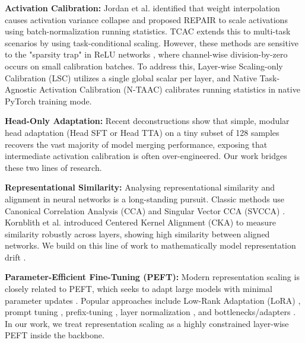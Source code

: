 \documentclass{article}
\theoremstyle{plain}
\theoremstyle{definition}
\theoremstyle{remark}
\begin{document}
\textbf{Activation Calibration:} Jordan et al. \cite{jordan2023repair} identified that weight interpolation causes activation variance collapse and proposed REPAIR to scale activations using batch-normalization \cite{ioffe2015batch} running statistics. TCAC \cite{anonymous2026pragmatic} extends this to multi-task scenarios by using task-conditional scaling. However, these methods are sensitive to the "sparsity trap" in ReLU networks \cite{anonymous2026less}, where channel-wise division-by-zero occurs on small calibration batches. To address this, Layer-wise Scaling-only Calibration (LSC) \cite{anonymous2026less} utilizes a single global scalar per layer, and Native Task-Agnostic Activation Calibration (N-TAAC) \cite{anonymous2026deconstructing} calibrates running statistics in native PyTorch \cite{paszke2019pytorch} training mode.

\textbf{Head-Only Adaptation:} Recent deconstructions \cite{anonymous2026deconstructing_head} show that simple, modular head adaptation (Head SFT or Head TTA) on a tiny subset of 128 samples recovers the vast majority of model merging performance, exposing that intermediate activation calibration is often over-engineered. Our work bridges these two lines of research.

\textbf{Representational Similarity:} Analysing representational similarity and alignment in neural networks is a long-standing pursuit. Classic methods use Canonical Correlation Analysis (CCA) and Singular Vector CCA (SVCCA) \cite{raghu2017svcca, morcos2018insights}. Kornblith et al. \cite{kornblith2019similarity} introduced Centered Kernel Alignment (CKA) to measure similarity robustly across layers, showing high similarity between aligned networks. We build on this line of work to mathematically model representation drift \cite{garg2022path, lenc2015understanding}.

\textbf{Parameter-Efficient Fine-Tuning (PEFT):} Modern representation scaling is closely related to PEFT, which seeks to adapt large models with minimal parameter updates \cite{hu2021lora, he2021towards}. Popular approaches include Low-Rank Adaptation (LoRA) \cite{hu2021lora}, prompt tuning \cite{lester2021power}, prefix-tuning \cite{li2021prefix}, layer normalization \cite{ba2016layer}, and bottlenecks/adapters \cite{houlsby2019parameter}. In our work, we treat representation scaling as a highly constrained layer-wise PEFT inside the backbone.
\end{document}
